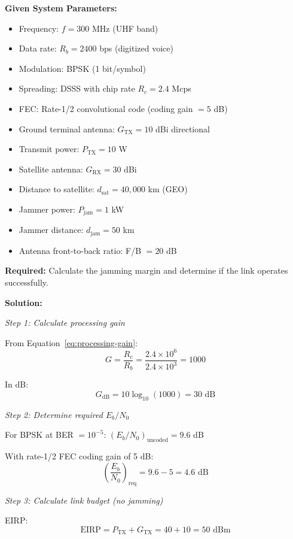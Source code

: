 \textbf{Given System Parameters:}
\begin{itemize}
\item Frequency: $f = 300$ MHz (UHF band)
\item Data rate: $R_b = 2400$ bps (digitized voice)
\item Modulation: BPSK (1 bit/symbol)
\item Spreading: DSSS with chip rate $R_c = 2.4$ Mcps
\item FEC: Rate-1/2 convolutional code (coding gain $= 5$ dB)
\item Ground terminal antenna: $G_{\text{TX}} = 10$ dBi directional
\item Transmit power: $P_{\text{TX}} = 10$ W
\item Satellite antenna: $G_{\text{RX}} = 30$ dBi
\item Distance to satellite: $d_{\text{sat}} = 40{,}000$ km (GEO)
\item Jammer power: $P_{\text{jam}} = 1$ kW
\item Jammer distance: $d_{\text{jam}} = 50$ km
\item Antenna front-to-back ratio: F/B $= 20$ dB
\end{itemize}

\textbf{Required:} Calculate the jamming margin and determine if the link operates successfully.

\textbf{Solution:}

\textit{Step 1: Calculate processing gain}

From Equation~\ref{eq:processing-gain}:
\begin{equation}
G = \frac{R_c}{R_b} = \frac{2.4 \times 10^6}{2.4 \times 10^3} = 1000
\end{equation}

In dB:
\begin{equation}
G_{\text{dB}} = 10\log_{10}(1000) = 30 \text{ dB}
\end{equation}

\textit{Step 2: Determine required $E_b/N_0$}

For BPSK at BER $= 10^{-5}$: $(E_b/N_0)_{\text{uncoded}} = 9.6$ dB

With rate-1/2 FEC coding gain of 5 dB:
\begin{equation}
\left(\frac{E_b}{N_0}\right)_{\text{req}} = 9.6 - 5 = 4.6 \text{ dB}
\end{equation}

\textit{Step 3: Calculate link budget (no jamming)}

EIRP:
\begin{equation}
\text{EIRP} = P_{\text{TX}} + G_{\text{TX}} = 40 + 10 = 50 \text{ dBm}
\end{equation}

